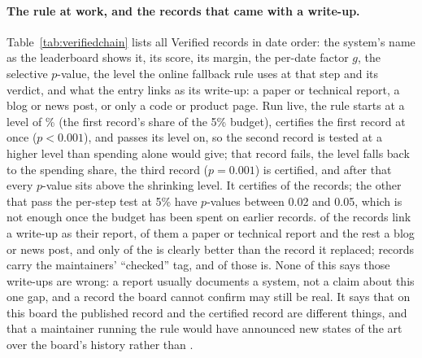 \documentclass[11pt]{article}
\begin{document}
\paragraph{The rule at work, and the records that came with a write-up.}
Table~\ref{tab:verifiedchain} lists all \NumClaimsSteps{} Verified records in date order: the system's name as the leaderboard shows it, its score, its margin, the per-date factor $g$, the selective $p$-value, the level the online fallback rule uses at that step and its verdict, and what the entry links as its write-up: a paper or technical report, a blog or news post, or only a code or product page.
Run live, the rule starts at a level of \NumClaimsFirstLevel\% (the first record's share of the 5\% budget), certifies the first record at once ($p<0.001$), and passes its level on, so the second record is tested at a higher level than spending alone would give; that record fails, the level falls back to the spending share, the third record ($p=0.001$) is certified, and after that every $p$-value sits above the shrinking level.
It certifies \NumClaimsFallbackCert{} of the \NumClaimsSteps{} records; the other \NumClaimsSigNotCert{} that pass the per-step test at 5\% have $p$-values between 0.02 and 0.05, which is not enough once the budget has been spent on earlier records.
\NumClaimsReport{} of the \NumClaimsSteps{} records link a write-up as their report, \NumClaimsPaper{} of them a paper or technical report and the rest a blog or news post, and only \NumClaimsReportSig{} of the \NumClaimsReport{} is clearly better than the record it replaced; \NumClaimsChecked{} records carry the maintainers' ``checked'' tag, and \NumClaimsCheckedSig{} of those is.
None of this says those write-ups are wrong: a report usually documents a system, not a claim about this one gap, and a record the board cannot confirm may still be real.
It says that on this board the published record and the certified record are different things, and that a maintainer running the rule would have announced \NumClaimsFallbackCert{} new states of the art over the board's history rather than \NumClaimsSteps{}.

\begin{table}[t]
\centering\scriptsize
\resizebox{\textwidth}{!}{}
\caption{Every record on SWE-bench Verified, in date order, with the online fallback rule run live. Score: the challenger's reported score (\%). Margin: its gain over the record it replaced (points). $g$: submissions sharing the challenger's date (the per-date factor). $p_{\mathrm{sel}}$: the selective $p$-value after that factor. Level: the level the fallback rule uses at that step; certified when $p_{\mathrm{sel}}$ is at or below it. Write-up: what the submission's leaderboard entry links as its report (paper: an arXiv paper or technical report; post: a blog or news post), or, with no report link, only a code or product page (site).}
\label{tab:verifiedchain}
\end{table}
\end{document}
